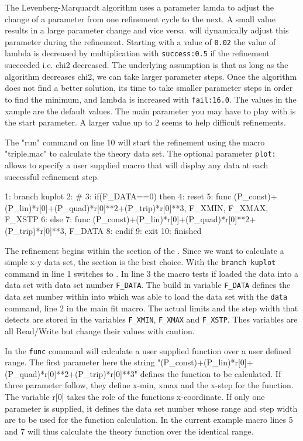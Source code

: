 The Levenberg-Marquardt algorithm uses a parameter lamda to adjust the 
change of a parameter from one refinement cycle to the next. A small 
value results in a large parameter change and vice versa. \Refine will
dynamically adjust this parameter during the refinement. Starting with 
a value of {\tt 0.02} the value of lambda is decreased by multiplication with 
{\tt success:0.5} if the refinement succeeded i.e. chi2 decreased. The
underlying assumption is that as long as the algorithm decreases chi2, 
we can take larger parameter steps. Once the algorithm does not find a
better solution, its time to take smaller parameter steps in order to
find the minimum, and lambda is increased with {\tt fail:16.0}. The 
values in the xample are the default values. The main parameter you may have 
to play with is the start parameter. A larger value up to 2 seems to help
difficult refinements.
 
The "run" command on line 10 will start the refinement using the macro 
"triple.mac" to calculate the theory data set. The optional parameter
{\tt plot:} allows to specify a user supplied macro that will display
any data at each successful refinement step.

\begin{MacVerbatim}
 1: branch kuplot
 2: #
 3: if(F_DATA==0) then
 4:    reset
 5:    func (P_const)+(P_lin)*r[0]+(P_quad)*r[0]**2+(P_trip)*r[0]**3, F_XMIN, F_XMAX, F_XSTP
 6: else
 7:    func (P_const)+(P_lin)*r[0]+(P_quad)*r[0]**2+(P_trip)*r[0]**3, F_DATA
 8: endif
 9: exit
10: finished
\end{MacVerbatim}

The refinement begins within the \Refine section of the \suite. Since we want to 
calculate a simple x-y data set, the \Kuplot section is the best choice. With the
{\tt branch kuplot} command in line 1 \Refine switches to \kuplot.  In line 3 the 
macro tests if \Refine loaded the data into a \Kuplot data set with data set number
{\tt F\_DATA}. The \Refine build in variable {\tt F\_DATA} defines the data set number 
within \Kuplot into which \Refine was able to load the data set with the {\tt data} 
command, line 2 in the main fit macro. The actual limits and the step width 
that \Refine detects are
stored in the \Refine variables {\tt F\_XMIN}, {\tt F\_XMAX} and {\tt F\_XSTP}. 
Thes variables are all Read/Write but change their values with caution.

In \Kuplot the {\tt func} command will calculate a user supplied function over a
user defined range. The first parameter here the string 
"(P\_const)+(P\_lin)*r[0]+(P\_quad)*r[0]**2+(P\_trip)*r[0]**3" defines the 
function to be calculated. If three parameter follow, they define x-min, xmax
and the x-step for the function. The \Suite variable r[0] takes the role of the
functions x-coordinate. If only one parameter is supplied, it defines the data
set number whose range and step width are to be used for the function calculation. 
In the current example macro lines 5 and 7 will thus calculate the theory function 
over the identical range. 

